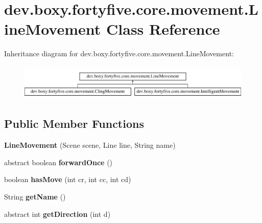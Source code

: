 \hypertarget{classdev_1_1boxy_1_1fortyfive_1_1core_1_1movement_1_1_line_movement}{
\section{dev.boxy.fortyfive.core.movement.LineMovement Class Reference}
\label{d8/d51/classdev_1_1boxy_1_1fortyfive_1_1core_1_1movement_1_1_line_movement}
}
Inheritance diagram for dev.boxy.fortyfive.core.movement.LineMovement:\begin{figure}[H]
\begin{center}
\leavevmode
\includegraphics[height=1.707317cm]{d8/d51/classdev_1_1boxy_1_1fortyfive_1_1core_1_1movement_1_1_line_movement}
\end{center}
\end{figure}
\subsection*{Public Member Functions}
\begin{DoxyCompactItemize}
\item 
\hypertarget{classdev_1_1boxy_1_1fortyfive_1_1core_1_1movement_1_1_line_movement_a9ecb57ea50c7b99efe6201409e6795e4}{
{\bfseries LineMovement} (Scene scene, Line line, String name)}
\label{d8/d51/classdev_1_1boxy_1_1fortyfive_1_1core_1_1movement_1_1_line_movement_a9ecb57ea50c7b99efe6201409e6795e4}

\item 
\hypertarget{classdev_1_1boxy_1_1fortyfive_1_1core_1_1movement_1_1_line_movement_ae5b788d5d15789c1f0a9e9398fdf666e}{
abstract boolean {\bfseries forwardOnce} ()}
\label{d8/d51/classdev_1_1boxy_1_1fortyfive_1_1core_1_1movement_1_1_line_movement_ae5b788d5d15789c1f0a9e9398fdf666e}

\item 
\hypertarget{classdev_1_1boxy_1_1fortyfive_1_1core_1_1movement_1_1_line_movement_a8a284d95d38e1fe0d2d2620f58b68784}{
boolean {\bfseries hasMove} (int cr, int cc, int cd)}
\label{d8/d51/classdev_1_1boxy_1_1fortyfive_1_1core_1_1movement_1_1_line_movement_a8a284d95d38e1fe0d2d2620f58b68784}

\item 
\hypertarget{classdev_1_1boxy_1_1fortyfive_1_1core_1_1movement_1_1_line_movement_a9735e410af9681de6ace5d6c482feafa}{
String {\bfseries getName} ()}
\label{d8/d51/classdev_1_1boxy_1_1fortyfive_1_1core_1_1movement_1_1_line_movement_a9735e410af9681de6ace5d6c482feafa}

\item 
\hypertarget{classdev_1_1boxy_1_1fortyfive_1_1core_1_1movement_1_1_line_movement_a0b0e76d40268776f4fe4e27fc35add57}{
abstract int {\bfseries getDirection} (int d)}
\label{d8/d51/classdev_1_1boxy_1_1fortyfive_1_1core_1_1movement_1_1_line_movement_a0b0e76d40268776f4fe4e27fc35add57}

\end{DoxyCompactItemize}

